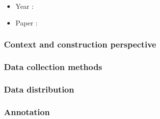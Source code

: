 \documentclass[10pt,onecolumn,letterpaper]{article}
\begin{document}
\begin{itemize}
	\item Year : 
	\item Paper : 
\end{itemize}

\subsubsection{Context and construction perspective}
\subsubsection{Data collection methods}
\subsubsection{Data distribution}
\subsubsection{Annotation}



\end{document}
